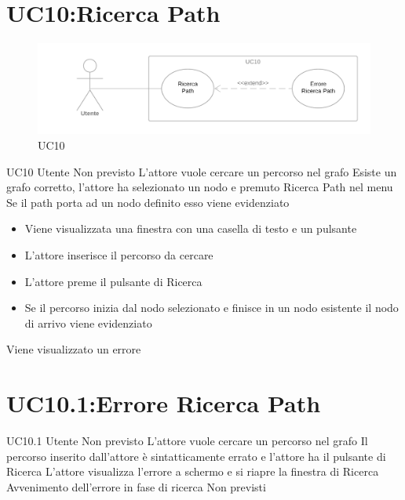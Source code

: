 \documentclass[../AnalisideiRequisiti.tex]{subfiles}
\begin{document}
\section{UC10:Ricerca Path}
\begin{figure}[H]
	\caption{UC10}
	\centering
	\includegraphics[width=\textwidth]{../img/UC10.png}
\end{figure}
\UserCase
{UC10}
{Utente}
{Non previsto}
{L'attore vuole cercare un percorso nel grafo}
{Esiste un grafo corretto, l'attore ha selezionato un nodo e premuto Ricerca Path nel menu}
{Se il path porta ad un nodo definito esso viene evidenziato }
{
	\begin{itemize}
		\item{} Viene visualizzata una finestra con una casella di testo e un pulsante
		\item{} L'attore inserisce il percorso da cercare
		\item{} L'attore preme il pulsante di Ricerca
		\item{} Se il percorso inizia dal nodo selezionato e finisce in un nodo esistente il nodo di arrivo viene evidenziato 
 	\end{itemize}
}
{Viene visualizzato un errore }

\section{UC10.1:Errore Ricerca Path}
\UserCase
{UC10.1}
{Utente}
{Non previsto}
{L'attore vuole cercare un percorso nel grafo}
{Il percorso inserito dall'attore è sintatticamente errato e l'attore ha il pulsante di Ricerca}
{L'attore visualizza l'errore a schermo e si riapre la finestra di Ricerca }
{Avvenimento dell'errore in fase di ricerca}
{Non previsti}
\end{document}
